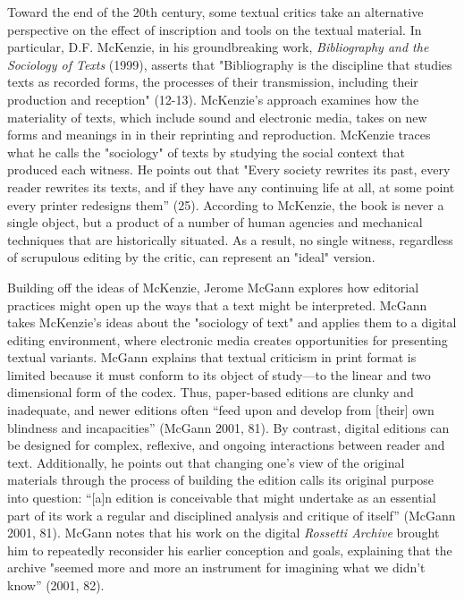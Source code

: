 \documentclass[11pt]{article}
\begin{document}
Toward the end of the 20th century, some textual critics take an
alternative perspective on the effect of inscription and tools on the
textual material. In particular, D.F. McKenzie, in his groundbreaking
work, \emph{Bibliography and the Sociology of Texts} (1999), asserts that
"Bibliography is the discipline that studies texts as recorded forms,
the processes of their transmission, including their production and
reception" (12-13). McKenzie's approach examines how the materiality
of texts, which include sound and electronic media, takes on new forms
and meanings in in their reprinting and reproduction. McKenzie traces
what he calls the "sociology" of texts by studying the social context
that produced each witness. He points out that "Every society rewrites
its past, every reader rewrites its texts, and if they have any
continuing life at all, at some point every printer redesigns them”
(25). According to McKenzie, the book is never a single object, but a
product of a number of human agencies and mechanical techniques that
are historically situated. As a result, no single witness, regardless
of scrupulous editing by the critic, can represent an "ideal" version.

Building off the ideas of McKenzie, Jerome McGann explores how
editorial practices might open up the ways that a text might be
interpreted.  McGann takes McKenzie's ideas about the "sociology of
text" and applies them to a digital editing environment, where
electronic media creates opportunities for presenting textual
variants. McGann explains that textual criticism in print format is
limited because it must conform to its object of study---to the linear
and two dimensional form of the codex. Thus, paper-based editions are
clunky and inadequate, and newer editions often “feed upon and develop
from [their] own blindness and incapacities” (McGann 2001, 81). By
contrast, digital editions can be designed for complex, reflexive, and
ongoing interactions between reader and text. Additionally, he points
out that changing one’s view of the original materials through the
process of building the edition calls its original purpose into
question: “[a]n edition is conceivable that might undertake as an
essential part of its work a regular and disciplined analysis and
critique of itself” (McGann 2001, 81). McGann notes that his work on
the digital \emph{Rossetti Archive} brought him to repeatedly reconsider
his earlier conception and goals, explaining that the archive "seemed
more and more an instrument for imagining what we didn’t know” (2001,
82).
\end{document}
